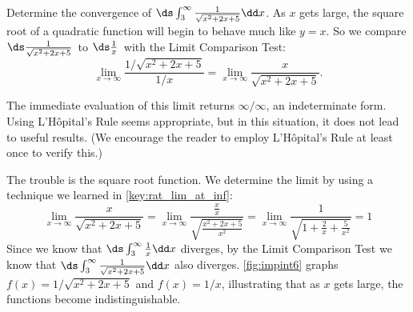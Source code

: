 \begin{example}\label{ex_impint6}%
Determine the convergence of $\ds \int_3^{\infty} \frac{1}{\sqrt{x^2+2x+5}}\dd x$.
\solution
As $x$ gets large, the square root of a quadratic function will begin to behave much like $y=x$. So we compare \small$\ds\frac{1}{\sqrt{x^2+2x+5}}$\normalsize\ to \small$\ds\frac1x$\normalsize\ with the Limit Comparison Test:
\[
\lim_{x\to\infty} \frac{1/\sqrt{x^2+2x+5}}{1/x}
= \lim_{x\to\infty}\frac{x}{\sqrt{x^2+2x+5}}.
\]

The immediate evaluation of this limit returns $\infty/\infty$, an indeterminate form. Using L'Hôpital's Rule seems appropriate, but in this situation, it does not lead to useful results. (We encourage the reader to employ L'Hôpital's Rule at least once to verify this.)

The trouble is the square root function.
We determine the limit by using a technique we learned in \autoref{key:rat_lim_at_inf}:
%
%
\[
 \lim_{x\to\infty}\frac x{\sqrt{x^2+2x+5}}
 =\lim_{x\to\infty}\frac{\frac xx}{\sqrt{\frac{x^2+2x+5}{x^2}}}
 =\lim_{x\to\infty}\frac1{\sqrt{1+\frac2x+\frac5{x^2}}}=1
\]
Since we know that $\ds\int_3^{\infty} \tfrac1x\dd x$ diverges, by the Limit Comparison Test we know that $\ds\int_3^\infty\tfrac1{\sqrt{x^2+2x+5}}\dd x$ also diverges. \autoref{fig:impint6} graphs $f(x)=1/\sqrt{x^2+2x+5}$ and $f(x)=1/x$, illustrating that as $x$ gets large, the functions become indistinguishable.
\end{example}

